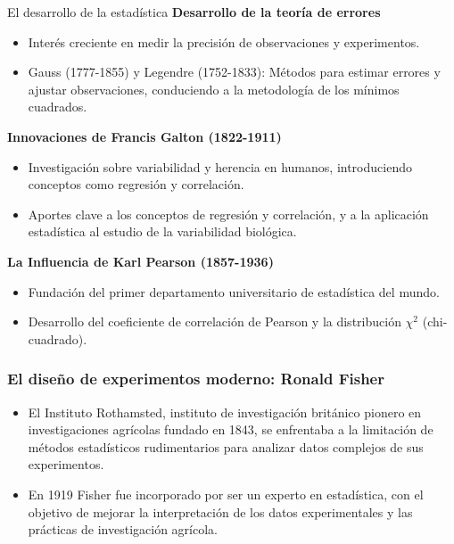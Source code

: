 ﻿\documentclass{beamer}
\begin{document}
\begin{frame}{El desarrollo de la estadística}
    \textbf{Desarrollo de la teoría de errores}
    \begin{itemize}
        \item Interés creciente en medir la precisión de observaciones y experimentos.
        \item Gauss (1777-1855) y Legendre (1752-1833): Métodos para estimar errores y ajustar observaciones, conduciendo a la metodología de los mínimos cuadrados.
    \end{itemize}
    
    \textbf{Innovaciones de Francis Galton (1822-1911)}
    \begin{itemize}
        \item Investigación sobre variabilidad y herencia en humanos, introduciendo conceptos como regresión y correlación.
        \item Aportes clave a los conceptos de regresión y correlación, y a la aplicación estadística al estudio de la variabilidad biológica.
    \end{itemize}
    
    \textbf{La Influencia de Karl Pearson (1857-1936)}
    \begin{itemize}
        \item Fundación del primer departamento universitario de estadística del mundo.
        \item Desarrollo del coeficiente de correlación de Pearson y la distribución $\chi^2$ (chi-cuadrado).
    \end{itemize}
\end{frame}

\begin{frame}
\frametitle{El diseño de experimentos moderno: Ronald Fisher}
    \begin{itemize}
        \item El Instituto Rothamsted, instituto de investigación británico pionero en investigaciones agrícolas fundado en 1843, se enfrentaba a la limitación de métodos estadísticos rudimentarios para analizar datos complejos de sus experimentos.
        \item En 1919 Fisher fue incorporado por ser un experto en estadística, con el objetivo de mejorar la interpretación de los datos experimentales y las prácticas de investigación agrícola.
    \end{itemize}
\end{frame}
\end{document}
